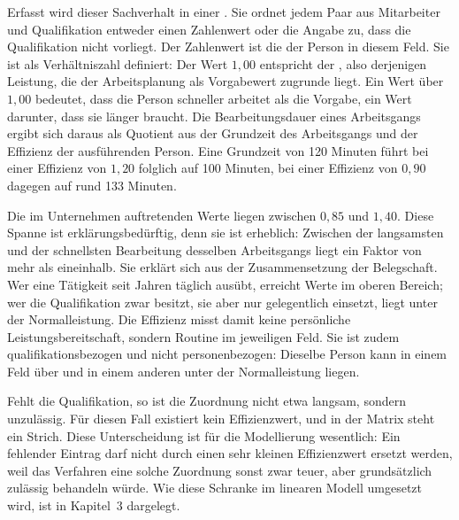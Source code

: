 Erfasst wird dieser Sachverhalt in einer . Sie ordnet
jedem Paar aus Mitarbeiter und Qualifikation entweder einen Zahlenwert oder die
Angabe zu, dass die Qualifikation nicht vorliegt. Der Zahlenwert ist die
 der Person in diesem Feld. Sie ist als Verhältniszahl definiert:
Der Wert $1{,}00$ entspricht der , also derjenigen Leistung, die
der Arbeitsplanung als Vorgabewert zugrunde liegt. Ein Wert über $1{,}00$
bedeutet, dass die Person schneller arbeitet als die Vorgabe, ein Wert
darunter, dass sie länger braucht. Die Bearbeitungsdauer eines Arbeitsgangs
ergibt sich daraus als Quotient aus der Grundzeit des Arbeitsgangs und der
Effizienz der ausführenden Person. Eine Grundzeit von 120 Minuten führt bei
einer Effizienz von $1{,}20$ folglich auf 100 Minuten, bei einer Effizienz von
$0{,}90$ dagegen auf rund 133 Minuten.

Die im Unternehmen auftretenden Werte liegen zwischen $0{,}85$ und $1{,}40$.
Diese Spanne ist erklärungsbedürftig, denn sie ist erheblich: Zwischen der
langsamsten und der schnellsten Bearbeitung desselben Arbeitsgangs liegt ein
Faktor von mehr als eineinhalb. Sie erklärt sich aus der Zusammensetzung der
Belegschaft. Wer eine Tätigkeit seit Jahren täglich ausübt, erreicht Werte im
oberen Bereich; wer die Qualifikation zwar besitzt, sie aber nur gelegentlich
einsetzt, liegt unter der Normalleistung. Die Effizienz misst damit keine
persönliche Leistungsbereitschaft, sondern Routine im jeweiligen Feld. Sie ist
zudem qualifikationsbezogen und nicht personenbezogen: Dieselbe Person kann in
einem Feld über und in einem anderen unter der Normalleistung liegen.

Fehlt die Qualifikation, so ist die Zuordnung nicht etwa langsam, sondern
unzulässig. Für diesen Fall existiert kein Effizienzwert, und in der Matrix
steht ein Strich. Diese Unterscheidung ist für die Modellierung wesentlich: Ein
fehlender Eintrag darf nicht durch einen sehr kleinen Effizienzwert ersetzt
werden, weil das Verfahren eine solche Zuordnung sonst zwar teuer, aber
grundsätzlich zulässig behandeln würde. Wie diese Schranke im linearen Modell
umgesetzt wird, ist in Kapitel~3 dargelegt.

\begin{landscape}
\begin{table}
  \centering
  
  \caption[Qualifikationsmatrix der Fertigung]{Qualifikationsmatrix: Effizienz je Mitarbeiter und Qualifikation. Der Wert 1,00 entspricht der Normalleistung; ein Strich bedeutet, dass die Qualifikation nicht vorliegt und die Zuordnung damit unzulässig ist.}
  \label{tab:qualifikationsmatrix}
\end{table}
\end{landscape}

